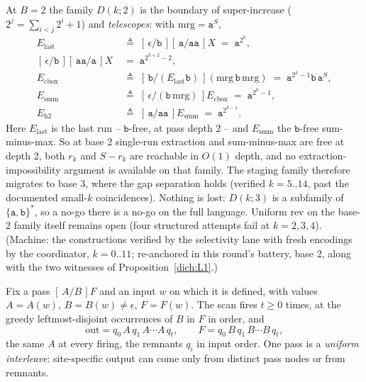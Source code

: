 \begin{proposition}
    \label{dich:prop:boundary}
    At $B = 2$ the family $D(k;2)$ is the boundary of super-increase
    ($2^j = \sum_{i<j} 2^i + 1$) and \emph{telescopes}: with
    $\mathrm{mrg} = \mathtt a^{S}$,
    \begin{align*}
        E_{\mathrm{last}} \;&\triangleq\;
        [\,\epsilon/\mathtt b\,][\,\mathtt a/\mathtt{aa}\,]X
        \;=\; \mathtt a^{2^k}, \\
        [\,\epsilon/\mathtt b\,][\,\mathtt{aa}/\mathtt a\,]X
        \;&=\; \mathtt a^{2^{k+2}-2}, \\
        E_{\mathrm{cbox}} \;&\triangleq\;
        [\,\mathtt b/(E_{\mathrm{last}}\mathtt b)\,]
        (\mathrm{mrg}\,\mathtt b\,\mathrm{mrg})
        \;=\; \mathtt a^{2^k-1}\mathtt b\,\mathtt a^{S}, \\
        E_{\mathrm{smm}} \;&\triangleq\;
        [\,\epsilon/(\mathtt b\,\mathrm{mrg})\,]E_{\mathrm{cbox}}
        \;=\; \mathtt a^{2^k-1}, \\
        E_{\mathrm{h2}} \;&\triangleq\;
        [\,\mathtt a/\mathtt{aa}\,]E_{\mathrm{smm}}
        \;=\; \mathtt a^{2^{k-1}}.
    \end{align*}
    Here $E_{\mathrm{last}}$ is the last run -- $\mathtt b$-free, at
    pass depth $2$ -- and $E_{\mathrm{smm}}$ the $\mathtt b$-free
    sum-minus-max.  So at base 2 single-run extraction and sum-minus-max
    are free at depth 2, both $r_k$ and $S - r_k$ are reachable in
    $O(1)$ depth, and no extraction-impossibility argument is
    available on that family.  The staging family therefore migrates
    to base 3, where
    the gap separation holds (verified $k = 5..14$, past the
    documented small-$k$ coincidences).  Nothing is lost:
    $D(k;3)$ is a subfamily of $\{\mathtt a,\mathtt b\}^*$, so a no-go
    there is a no-go on the full language.  Uniform $\mathrm{rev}$ on
    the base-2 family itself remains open (four structured attempts
    fail at $k = 2, 3, 4$).  (Machine: the constructions verified by
    the selectivity lane with fresh encodings by the coordinator,
    $k = 0..11$; re-anchored in this round's battery, base 2, along
    with the two witnesses of Proposition~\ref{dich:L1}.)
\end{proposition}

\begin{lemma}
    \label{dich:lem:sweep}
    Fix a pass $[\,A/B\,]F$ and an input $w$ on which it is defined,
    with values $A = A(w)$, $B = B(w) \ne \epsilon$, $F = F(w)$.  The
    scan fires $t \ge 0$ times, at the greedy leftmost-disjoint
    occurrences of $B$ in $F$ in order, and
    \begin{equation*}
        \mathrm{out} = q_0\,A\,q_1\,A\cdots A\,q_t, \qquad
        F = q_0\,B\,q_1\,B\cdots B\,q_t,
    \end{equation*}
    the same $A$ at every firing, the remnants $q_i$ in input order.
    One pass is a \emph{uniform interleave}: site-specific output can
    come only from distinct pass nodes or from remnants.
\end{lemma}

